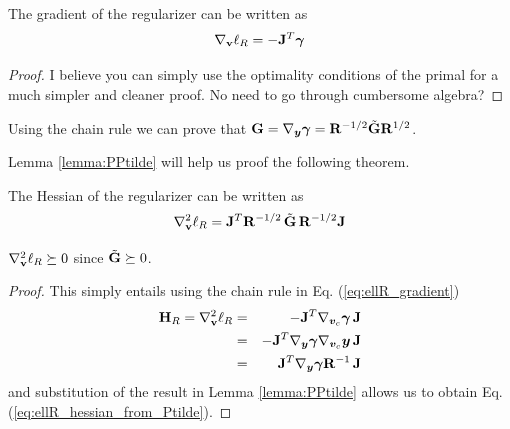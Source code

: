 
\begin{theorem}
	The gradient of the regularizer can be written as
	\begin{equation}
		\nabla_\mf{v}\ell_R = -\mf{J}^T\bgamma
		\label{eq:ellR_gradient}
	\end{equation}
\end{theorem}
\begin{proof}
	I believe you can simply use the optimality conditions of the primal for a much simpler and cleaner proof. No need to go through cumbersome algebra?
\end{proof}

\begin{lemma}
	Using the chain rule we can prove that ${\mathbf{G}} = \nabla_{{\bm{y}}}{\bm\gamma} = {\mathbf{R}}^{-1/2}\tilde{{\mathbf{G}}}{\mathbf{R}}^{1/2}$.
	\label{lemma:PPtilde}
\end{lemma}


Lemma \ref{lemma:PPtilde} will help us proof the following theorem.
\begin{theorem}
	The Hessian of the regularizer can be written as
	\begin{equation}
		\nabla_\mf{v}^2\ell_R = \sJT\ssqrtRinv\,\sGtilde\,\ssqrtRinv\sJ
		\label{eq:ellR_hessian_from_Ptilde}
	\end{equation}
\end{theorem}
\begin{corollary}
	$\nabla_{\mathbf{v}}^2\ell_R\succeq 0 $ since $\tilde{{\mathbf{G}}} \succeq 0$.
\end{corollary}
\begin{proof}
This simply entails using the chain rule in Eq. (\ref{eq:ellR_gradient}) 
\begin{eqnarray}
	{\mathbf{H}}_R = \nabla_{\mathbf{v}}^2\ell_R &=& -{\mathbf{J}}^T \nabla_{{\bm{v}}_c}{\bm\gamma}\,{\mathbf{J}}\nonumber\\
	&=&-{\mathbf{J}}^T \nabla_{{\bm{y}}}{\bm\gamma}\nabla_{{\bm{v}}_c}{\bm{y}}\,{\mathbf{J}}\nonumber\\
	&=&{\mathbf{J}}^T \nabla_{{\bm{y}}}{\bm\gamma}{\mathbf{R}}^{-1}\,{\mathbf{J}}
\end{eqnarray}
and substitution of the result in Lemma \ref{lemma:PPtilde} allows us to obtain
 Eq. (\ref{eq:ellR_hessian_from_Ptilde}).
\end{proof} 


